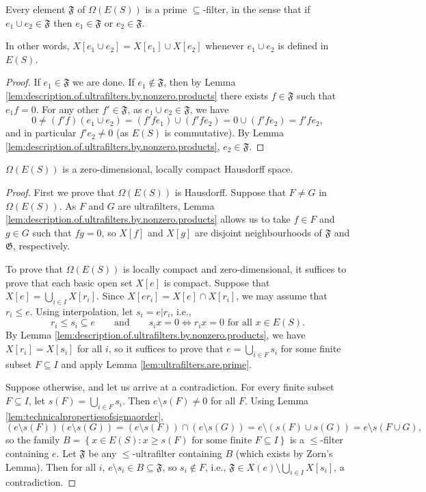 \begin{lemma}\label{lem:ultrafilters.are.prime}
    Every element $\mathfrak{F}$ of $\Omega(E(S))$ is a prime $\subseteq$-filter, in the sense that if $e_1\cup e_2\in\mathfrak{F}$ then $e_1\in\mathfrak{F}$ or $e_2\in\mathfrak{F}$.
    
    In other words, $X[e_1\cup e_2]=X[e_1]\cup X[e_2]$ whenever $e_1\cup e_2$ is defined in $E(S)$.
\end{lemma}
\begin{proof}
    If $e_1\in\mathfrak{F}$ we are done. If $e_1\not\in\mathfrak{F}$, then by Lemma \ref{lem:description.of.ultrafilters.by.nonzero.products} there exists $f\in\mathfrak{F}$ such that $e_1f=0$. For any other $f'\in\mathfrak{F}$, as $e_1\cup e_2\in\mathfrak{F}$, we have
    \[0\neq (f'f)(e_1\cup e_2)=(f'fe_1)\cup (f'fe_2)=0\cup (f'fe_2)=f'fe_2,\]
    and in particular $f'e_2\neq 0$ (as $E(S)$ is commutative). By Lemma \ref{lem:description.of.ultrafilters.by.nonzero.products}, $e_2\in\mathfrak{F}$.\qedhere
\end{proof}

\begin{proposition}
$\Omega(E(S))$ is a zero-dimensional, locally compact Hausdorff space.
\end{proposition}
\begin{proof}
    First we prove that $\Omega(E(S))$ is Hausdorff. Suppose that $F\neq G$ in $\Omega(E(S))$. As $F$ and $G$ are ultrafilters, Lemma \ref{lem:description.of.ultrafilters.by.nonzero.products} allows us to take $f\in F$ and $g\in G$ such that $fg=0$, so $X[f]$ and $X[g]$ are disjoint neighbourhoods of $\mathfrak{F}$ and $\mathfrak{G}$, respectively.
    
    To prove that $\Omega(E(S))$ is locally compact and zero-dimensional, it suffices to prove that each basic open set $X[e]$ is compact. Suppose that $X[e]=\bigcup_{i\in I}X[r_i]$. Since $X[er_i]=X[e]\cap X[r_i]$, we may assume that $r_i\leq e$. Using interpolation, let $s_i=e|r_i$, i.e.,
    \[r_i\leq s_i\subseteq e\qquad\text{and}\qquad s_ix=0\iff r_ix=0\text{ for all }x\in E(S).\]
    By Lemma \ref{lem:description.of.ultrafilters.by.nonzero.products}, we have $X[r_i]=X[s_i]$ for all $i$, so it suffices to prove that $e=\bigcup_{i\in F}s_i$ for some finite subset $F\subseteq I$ and apply Lemma \ref{lem:ultrafilters.are.prime}.
    
    Suppose otherwise, and let us arrive at a contradiction. For every finite subset $F\subseteq I$, let $s(F)=\bigcup_{i\in F}s_i$. Then $e\setminus s(F)\neq 0$ for all $F$. Using Lemma \ref{lem:technicalpropertiesofsigmaorder},
    \[(e\setminus s(F))(e\setminus s(G))=(e\setminus s(F))\cap(e\setminus s(G))=e\setminus(s(F)\cup s(G))=e\setminus s(F\cup G), \]
    so the family $B=\left\{x\in E(S):x\geq s(F)\text{ for some finite }F\subseteq I\right\}$ is a $\leq$-filter containing $e$. Let $\mathfrak{F}$ be any $\leq$-ultrafilter containing $B$ (which exists by Zorn's Lemma). Then for all $i$, $e\setminus s_i\in B\subseteq \mathfrak{F}$, so $s_i\not\in F$, i.e., $\mathfrak{F}\in X(e)\setminus\bigcup_{i\in I}X[s_i]$, a contradiction.\qedhere
\end{proof}

